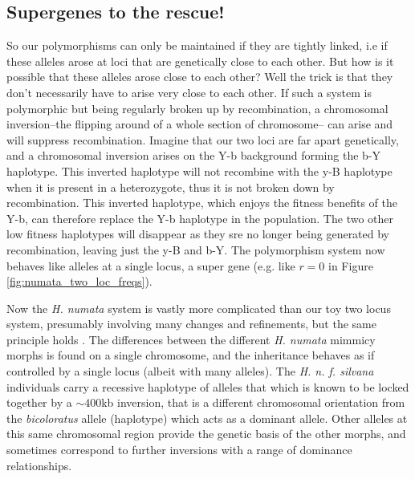 \subsection{Supergenes to the rescue!} \label{Section:super_genes}

So our polymorphisms can only be maintained if they are tightly linked, i.e if these alleles arose at loci that are genetically close to each other. But how is it possible that these alleles arose close to each other? Well the trick is that they don't necessarily have to arise very close to each other. If such a system is polymorphic but being regularly broken up by recombination, a chromosomal inversion--the flipping around of a whole section of chromosome-- can arise and will suppress recombination. Imagine that our two loci are far apart genetically, and a chromosomal inversion arises on the Y-b  background forming the b-Y haplotype. This inverted haplotype will not recombine with the y-B haplotype when it is present in a heterozygote, thus it is not broken down by recombination. This inverted haplotype, which enjoys the fitness benefits of the Y-b, can therefore replace the Y-b haplotype in the population. The two other low fitness haplotypes will disappear as they sre no longer being generated by recombination, leaving just the y-B and b-Y. 
  The polymorphism system now behaves like alleles at a single locus, a super gene  (e.g. like $r=0$ in Figure \ref{fig:numata_two_loc_freqs}).

  Now the {\it H. numata} system is vastly more complicated than our toy two locus system, presumably involving many changes and refinements, but the same principle holds \citep{joron2011chromosomal}. The differences between the different {\it H. numata} mimmicy morphs is found on a single chromosome, and the inheritance behaves as if controlled by a single locus (albeit with many alleles).  The {\it H. n. f. silvana} individuals carry a recessive haplotype of alleles that which is known to be locked together by a $\sim 400$kb inversion, that is a different chromosomal orientation from the {\it bicoloratus} allele (haplotype) which acts as a dominant allele. Other alleles at this same chromosomal region provide the genetic basis of the other morphs, and sometimes correspond to further inversions with a range of dominance relationships. 


